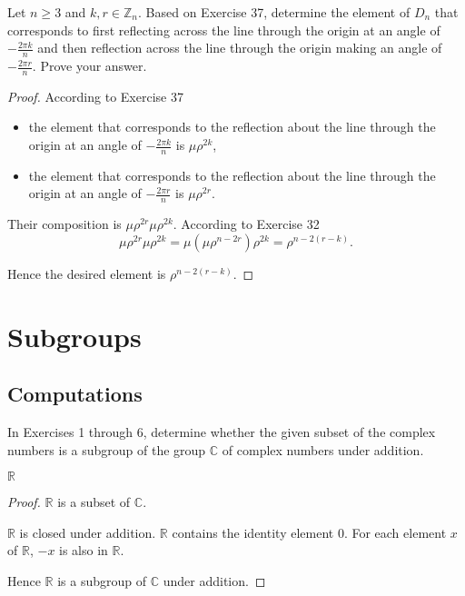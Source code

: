 \begin{exercise}
    Let $n\geq 3$ and $k, r\in\mathbb{Z}_{n}$. Based on Exercise 37, determine the element of $D_{n}$ that corresponds to first reflecting across the line through the origin at an angle of $-\frac{2\pi k}{n}$ and then reflection across the line through the origin making an angle of $-\frac{2\pi r}{n}$. Prove your answer.
\end{exercise}

\begin{proof}
    According to Exercise 37
    \begin{itemize}
        \item the element that corresponds to the reflection about the line through the origin at an angle of $-\frac{2\pi k}{n}$ is $\mu\rho^{2k}$,
        \item the element that corresponds to the reflection about the line through the origin at an angle of $-\frac{2\pi r}{n}$ is $\mu\rho^{2r}$.
    \end{itemize}

    Their composition is $\mu\rho^{2r}\mu\rho^{2k}$. According to Exercise 32
    \[
        \mu\rho^{2r}\mu\rho^{2k} = \mu(\mu\rho^{n-2r})\rho^{2k} = \rho^{n-2(r-k)}.
    \]

    Hence the desired element is $\rho^{n-2(r-k)}$.
\end{proof}

\section{Subgroups}

\subsection*{Computations}

In Exercises 1 through 6, determine whether the given subset of the complex numbers is a subgroup of the group $\mathbb{C}$ of complex numbers under addition.

\begin{exercise}
    $\mathbb{R}$
\end{exercise}

\begin{proof}
    $\mathbb{R}$ is a subset of $\mathbb{C}$.

    $\mathbb{R}$ is closed under addition. $\mathbb{R}$ contains the identity element $0$. For each element $x$ of $\mathbb{R}$, $-x$ is also in $\mathbb{R}$.

    Hence $\mathbb{R}$ is a subgroup of $\mathbb{C}$ under addition.
\end{proof}


